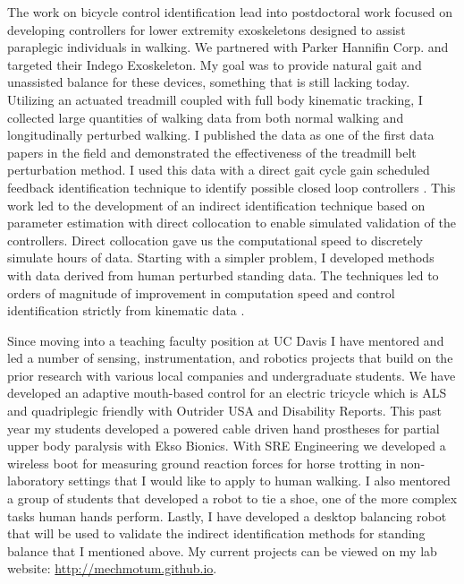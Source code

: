 \documentclass[letter,titlepage]{article}
\begin{document}
The work on bicycle control identification lead into postdoctoral work focused
on developing controllers for lower extremity exoskeletons designed to assist
paraplegic individuals in walking. We partnered with Parker Hannifin Corp. and
targeted their Indego Exoskeleton. My goal was to provide natural gait and
unassisted balance for these devices, something that is still lacking today.
Utilizing an actuated treadmill coupled with full body kinematic tracking, I
collected large quantities of walking data from both normal walking and
longitudinally perturbed walking. I published the data as one of the first data
papers in the field \cite{Moore2015b} and demonstrated the effectiveness of the
treadmill belt perturbation method. I used this data with a direct gait cycle
gain scheduled feedback identification technique to identify possible closed
loop controllers \cite{Moore2013c,Moore2014a,Moore2014c}. This work led to
the development of an indirect identification technique based on parameter
estimation with direct collocation to enable simulated validation of the
controllers. Direct collocation gave us the computational speed to discretely
simulate hours of data. Starting with a simpler problem, I developed methods
with data derived from human perturbed standing data. The techniques led to
orders of magnitude of improvement in computation speed and control
identification strictly from kinematic data \cite{Moore2014e,Moore2015}.

Since moving into a teaching faculty position at UC Davis I have mentored and
led a number of sensing, instrumentation, and robotics projects that build on
the prior research with various local companies and undergraduate students. We
have developed an adaptive mouth-based control for an electric tricycle which
is ALS and quadriplegic friendly with Outrider USA and Disability Reports. This
past year my students developed a powered cable driven hand prostheses for
partial upper body paralysis with Ekso Bionics. With SRE Engineering we
developed a wireless boot for measuring ground reaction forces for horse
trotting in non-laboratory settings that I would like to apply to human
walking. I also mentored a group of students that developed a robot to tie a
shoe, one of the more complex tasks human hands perform. Lastly, I have
developed a desktop balancing robot that will be used to validate the indirect
identification methods for standing balance that I mentioned above. My current
projects can be viewed on my lab website: \url{http://mechmotum.github.io}.
\end{document}

